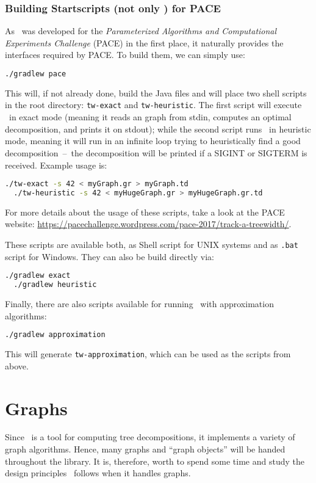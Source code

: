 \documentclass[a4paper, ukenglish, twoside, openright]{jdrasilmanual}
\begin{document}
\section{Building Startscripts (not only ) for PACE}
As \Jdrasil\ was developed for the \emph{Parameterized Algorithms and
  Computational Experiments Challenge} (PACE) \cite{pace} in the first place, it
naturally provides the interfaces required by PACE. To build them, we
can simply use:
\begin{lstlisting}[language=bash]
  ./gradlew pace
\end{lstlisting}
This will, if not already done, build the Java files and will place
two shell scripts in the root directory: \texttt{tw-exact} and
\texttt{tw-heuristic}. The first script will execute \Jdrasil\ in
exact mode (meaning it reads an graph from stdin, computes an optimal
decomposition, and prints it on stdout); while the second script runs
\Jdrasil\ in heuristic mode, meaning it will run in an infinite loop
trying to heuristically find a good decomposition~–~the decomposition
will be printed if a SIGINT or SIGTERM is received. Example usage is:
\begin{lstlisting}[language=bash]
  ./tw-exact -s 42 < myGraph.gr > myGraph.td
  ./tw-heuristic -s 42 < myHugeGraph.gr > myHugeGraph.gr.td
\end{lstlisting}
For more details about the usage of these scripts, take a look at the
PACE website: \url{https://pacechallenge.wordpress.com/pace-2017/track-a-treewidth/}.

These scripts are available both, as Shell script for UNIX systems and
as \texttt{.bat} script for Windows. They can also be build directly
via:
\begin{lstlisting}[language=bash]
  ./gradlew exact
  ./gradlew heuristic
\end{lstlisting}
Finally, there are also scripts available for running \Jdrasil\ with
approximation algorithms:
\begin{lstlisting}[language=bash]
  ./gradlew approximation
\end{lstlisting}
This will generate \texttt{tw-approximation}, which can be used as the
scripts from above.

\part{Graphs}
Since \Jdrasil\ is a tool for computing tree decompositions, it
implements a variety of graph algorithms. Hence, many graphs and
``graph objects'' will be handed throughout the library. It is,
therefore, worth to spend some time and study the design principles
\Jdrasil\ follows when it handles graphs.
\end{document}
